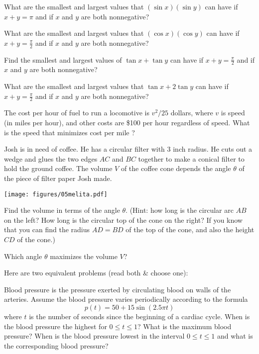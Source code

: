 \begin{multicols}{2}
\problem What are the smallest and largest values that $(\sin x)(\sin y)$ can
have if  $x+y=\pi$ and if $x$ and $y$ are both nonnegative?


\problem What are the smallest and largest values that $(\cos x)(\cos y)$ can
have if  $x+y=\frac\pi2$ and if $x$ and $y$ are both nonnegative?


\problem %
\subprob  Find the smallest and largest values of $\tan x
+ \tan y$ can have if $x+y=\frac\pi2$ and if $x$ and $y$ are both
nonnegative?

\subprob
What are the smallest and largest values that $\tan x + 2\tan y$ can
have if  $x+y=\frac\pi2$ and if $x$ and $y$ are both nonnegative?


\problem The cost per hour of fuel to run a locomotive is $v^2 /25$
dollars, where $v$ is speed (in miles per hour), and other costs are \$100
per hour regardless of speed. What is the speed that minimizes cost per
mile ?


\problem \groupproblem %

Josh is in need of coffee.  He has a circular filter with 3 inch
radius.  He cuts out a wedge and glues the two edges $AC$ and $BC$
together to make a conical filter to hold the ground coffee.  The
volume $V$ of the coffee cone depends the angle $\theta$ of the piece
of filter paper Josh made.

\centerline{\texttt{[image: figures/05melita.pdf]}}

\subprob  Find the volume in terms of the angle $\theta$.  (Hint:
how long is the  circular arc $AB$ on the left?  How long is the
circular top of the cone on the right?  If you know that you can find
the radius $AD=BD$ of the top of the cone, and also the height $CD$ of
the cone.)

\subprob Which angle $\theta$ maximizes the volume $V$?

\problem  Here are two equivalent problems (read both \& choose one):

\subprob Blood pressure is the pressure exerted by circulating blood on
walls of the arteries. Assume the blood pressure varies periodically
according to the formula
\[
  p(t) = 50 +15\sin(2.5\pi t)
\]
where $t$ is the number of seconds since the beginning of a cardiac
cycle. When is the blood pressure the highest for $0 \leq t \leq 1$? What
is the maximum blood pressure? When is the blood pressure lowest in the
interval $0 \leq t \leq 1$ and what is the corresponding blood pressure?


\end{multicols}
